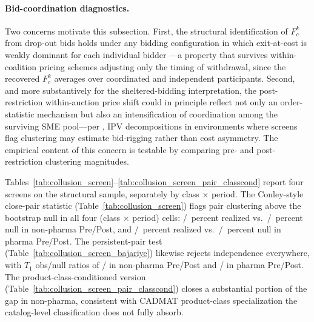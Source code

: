 \paragraph{Bid-coordination diagnostics.}\label{sec:bid_coord} Two concerns motivate this subsection. First, the structural identification of $F_c^k$ from drop-out bids holds under any bidding configuration in which exit-at-cost is weakly dominant for each individual bidder \citep{haile2003}---a property that survives within-coalition pricing schemes adjusting only the timing of withdrawal, since the recovered $F_c^k$ averages over coordinated and independent participants. Second, and more substantively for the sheltered-bidding interpretation, the post-restriction within-auction price shift could in principle reflect not only an order-statistic mechanism but also an intensification of coordination among the surviving SME pool---per \citet{kawainakabayashi2022}, IPV decompositions in environments where screens flag clustering may estimate bid-rigging rather than cost asymmetry. The empirical content of this concern is testable by comparing pre- and post-restriction clustering magnitudes.

Tables~\ref{tab:collusion_screen}--\ref{tab:collusion_screen_pair_classcond} report four screens on the structural sample, separately by class $\times$ period. The Conley-style close-pair statistic (Table~\ref{tab:collusion_screen}) flags pair clustering above the bootstrap null in all four (class $\times$ period) cells: \collConleyRealPreNp/\collConleyRealPostNp~percent realized vs.\ \collConleyNullPreNp/\collConleyNullPostNp~percent null in non-pharma Pre/Post, and \collConleyRealPrePh/\collConleyRealPostPh~percent realized vs.\ \collConleyNullPrePh/\collConleyNullPostPh~percent null in pharma Pre/Post. The \citet{bajariye2003} persistent-pair test (Table~\ref{tab:collusion_screen_bajariye}) likewise rejects independence everywhere, with $T_1$ obs/null ratios of \collBYRatioPreNp/\collBYRatioPostNp{} in non-pharma Pre/Post and \collBYRatioPrePh/\collBYRatioPostPh{} in pharma Pre/Post. The product-class-conditioned version (Table~\ref{tab:collusion_screen_pair_classcond}) closes a substantial portion of the gap in non-pharma, consistent with CADMAT product-class specialization the catalog-level classification does not fully absorb.

